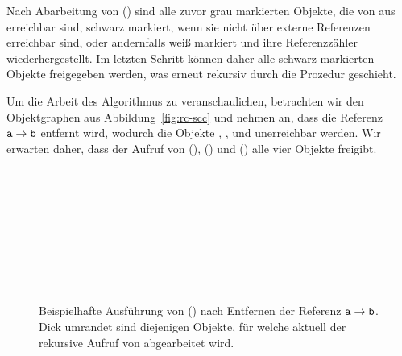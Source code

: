 Nach Abarbeitung von () sind alle zuvor grau markierten Objekte, die von  aus erreichbar sind, schwarz markiert, wenn sie nicht über externe Referenzen erreichbar sind, oder andernfalls weiß markiert und ihre Referenzzähler wiederhergestellt.
Im letzten Schritt können daher alle schwarz markierten Objekte freigegeben werden, was erneut rekursiv durch die Prozedur  geschieht.

Um die Arbeit des Algorithmus zu veranschaulichen, betrachten wir den Objektgraphen aus Abbildung~\ref{fig:rc-scc} und nehmen an, dass die Referenz $\texttt{a} \rightarrow \texttt{b}$ entfernt wird, wodurch die Objekte , ,  und  unerreichbar werden.
Wir erwarten daher, dass der Aufruf von (), () und () alle vier Objekte freigibt.

\begin{figure}[h]
	\centering
	\begin{subfigure}{0.4\textwidth}
		\centering
		
	\end{subfigure}~\hspace{0.5cm}~
	\begin{subfigure}{0.473\textwidth}
		\centering
		
	\end{subfigure}\\[1cm]
	\begin{subfigure}{0.4\textwidth}
		\centering
		
	\end{subfigure}~\hspace{0.5cm}~
	\begin{subfigure}{0.4\textwidth}
		\centering
		
	\end{subfigure}\\[1cm]
	\begin{subfigure}{0.4\textwidth}
		\centering
		
	\end{subfigure}~\hspace{0.5cm}~
	\begin{subfigure}{0.4\textwidth}
		\centering
		
	\end{subfigure}
	\caption[Ausführung von ()]{Beispielhafte Ausführung von () nach Entfernen der Referenz $\texttt{a} \rightarrow \texttt{b}$. Dick umrandet sind diejenigen Objekte, für welche aktuell der rekursive Aufruf von  abgearbeitet wird.}
	\label{fig:rc-markgray-example}
\end{figure}

